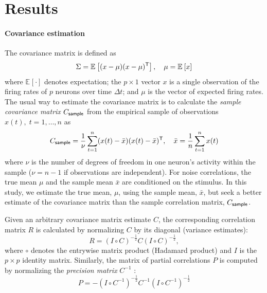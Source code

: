 \documentclass[10pt]{article}
\newcommand{\T}{{\sf T}}
\newcommand{\E}[2][]{\mathbb E_{#1}\left[ #2\right]}    %
\begin{document}
\section*{Results}
\paragraph{Covariance estimation}
The covariance matrix is defined as
\begin{equation}\label{eq:true-covariance}
    \Sigma = \E{(x-\mu)(x-\mu)^\T},\quad \mu = \E{x}
\end{equation}
where $\E{\cdot}$ denotes expectation; the $p\times 1$ vector $x$ is a single observation of the firing rates of $p$ neurons over time $\Delta t$; and $\mu$ is the vector of expected firing rates.  The usual way to estimate the covariance matrix is to calculate the \emph{sample covariance matrix} $C_{\sf sample}$ from the empirical sample of observations $x(t),\; t=1,\ldots,n$ as
\begin{equation}\label{eq:sample}
    C_{\sf sample} = \frac 1 \nu \sum\limits_{t=1}^n (x(t)-\bar x)(x(t)-\bar x)^\T,\quad \bar x= \frac 1 n \sum\limits_{t=1}^n x(t)
\end{equation}
where $\nu$ is the number of degrees of freedom in one neuron's activity within the sample ($\nu=n-1$ if observations are independent). For noise correlations, the true mean $\mu$ and the sample mean $\bar x$ are conditioned on the stimulus. In this study, we estimate the true mean, $\mu$, using the sample mean, $\bar x$, but seek a better estimate of the covariance matrix than the sample correlation matrix, $C_{\sf sample}$.  

Given an arbitrary covariance matrix estimate $C$, the corresponding correlation matrix $R$ is calculated by normalizing $C$ by its diagonal (variance estimates):
\begin{equation}\label{eq:precision}
    R = \left(I\circ C\right)^{-\frac 1 2} C \left(I\circ C\right)^{-\frac 1 2},
\end{equation}
where $\circ$ denotes the entrywise matrix product (Hadamard product) and $I$ is the $p\times p$ identity matrix. 
Similarly, the matrix of partial correlations $P$ is computed by normalizing the \emph{precision matrix} $C^{-1}$ \cite{Whittaker:2009}:
\begin{equation}\label{eq:partial}
    P = -\left(I\circ C^{-1}\right)^{-\frac 1 2} C^{-1} \left(I\circ C^{-1}\right)^{-\frac 1 2}
\end{equation}
\end{document}
